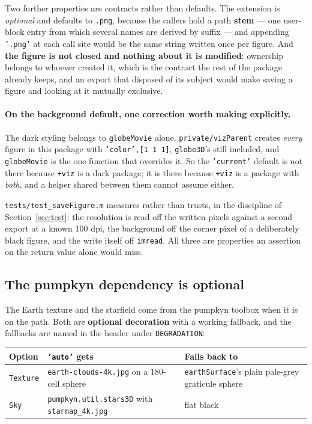 \documentclass[11pt]{article}
\newcommand{\code}[1]{\texttt{#1}}
\newcommand{\pkg}[1]{\texttt{+#1}}
\begin{document}
Two further properties are contracts rather than defaults. The extension is
\emph{optional} and defaults to \code{.png}, because the callers hold a path
\textbf{stem} --- one user-block entry from which several names are derived by
suffix --- and appending \code{'.png'} at each call site would be the same
string written once per figure. And \textbf{the figure is not closed and nothing
about it is modified}: ownership belongs to whoever created it, which is the
contract the rest of the package already keeps, and an export that disposed of
its subject would make saving a figure and looking at it mutually exclusive.

\paragraph{On the background default, one correction worth making explicitly.}
The dark styling belongs to \code{globeMovie} alone. \code{private/vizParent}
creates \emph{every} figure in this package with \code{'color',[1 1 1]},
\code{globe3D}'s still included, and \code{globeMovie} is the one function that
overrides it. So the \code{'current'} default is not there because \pkg{viz} is
a dark package; it is there because \pkg{viz} is a package with \emph{both}, and
a helper shared between them cannot assume either.

\code{tests/test\_saveFigure.m} measures rather than trusts, in the discipline
of Section~\ref{sec:test}: the resolution is read off the written pixels against
a second export at a known 100 dpi, the background off the corner pixel of a
deliberately black figure, and the write itself off \code{imread}. All three are
properties an assertion on the return value alone would miss.

\subsection{The pumpkyn dependency is optional}

The Earth texture and the starfield come from the pumpkyn toolbox when it is on
the path. Both are \textbf{optional decoration} with a working fallback, and
the fallbacks are named in the header under \code{DEGRADATION}:

\begin{center}
\begin{tabular}{lp{5.7cm}p{5.6cm}}
\toprule
Option & \code{'auto'} gets & Falls back to \\
\midrule
\code{Texture} & \code{earth-clouds-4k.jpg} on a 180-cell sphere & \code{earthSurface}'s plain pale-grey graticule sphere \\
\code{Sky}     & \code{pumpkyn.util.stars3D} with \code{starmap\_4k.jpg} & flat black \\
\bottomrule
\end{tabular}
\end{center}
\end{document}
